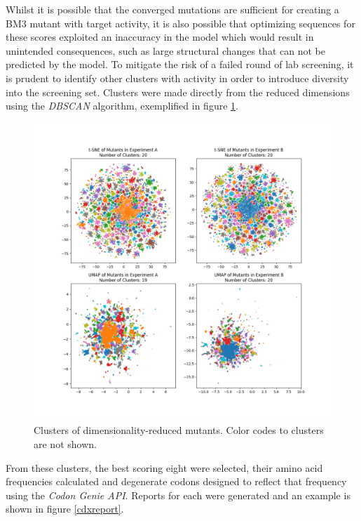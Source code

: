 \documentclass[16pt]{book}
\begin{document}
Whilst it is possible that the converged mutations are sufficient for creating a BM3 mutant with target activity, it is also possible that optimizing sequences for these scores exploited an inaccuracy in the model which would result in unintended consequences, such as large structural changes that can not be predicted by the model.
To mitigate the risk of a failed round of lab screening, it is prudent to identify other clusters with activity in order to introduce diversity into the screening set.
Clusters were made directly from the reduced dimensions using the \textit{DBSCAN} algorithm, exemplified in figure \ref{dimredclusters}.

\begin{figure}
	\includegraphics[width=\textwidth]{img/dimred-plt-clusters.png}
	\caption{\label{dimredclusters} Clusters of dimensionality-reduced mutants. Color codes to clusters are not shown.}
\end{figure}

From these clusters, the best scoring eight were selected, their amino acid frequencies calculated and degenerate codons designed to reflect that frequency using the \textit{Codon Genie API}.
Reports for each were generated and an example is shown in figure \ref{cdxreport}.
\end{document}
